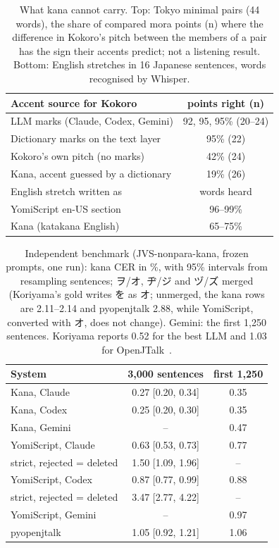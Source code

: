 \documentclass{Interspeech}
\newcommand{\ys}[1]{\mbox{\ipafont #1}}
\begin{document}
\begin{table}[t]
\centering\footnotesize
\caption{What kana cannot carry. Top: Tokyo minimal pairs (44 words), the share of compared mora points (n) where
the difference in Kokoro's pitch between the members of a pair has the sign their accents predict; not a listening
result. Bottom: English
stretches in 16 Japanese sentences, words recognised by Whisper.}
\label{tab:kana}
\setlength{\tabcolsep}{3pt}
\begin{tabular}{lc}
\toprule
Accent source for Kokoro & points right (n)\\
\midrule
LLM marks (Claude, Codex, Gemini) & 92, 95, 95\% (20--24)\\
Dictionary marks on the text layer & 95\% (22)\\
Kokoro's own pitch (no marks) & 42\% (24)\\
Kana, accent guessed by a dictionary & 19\% (26)\\
\midrule
English stretch written as & words heard\\
\midrule
YomiScript \ys{en-US} section & 96--99\%\\
Kana (katakana English) & 65--75\%\\
\bottomrule
\end{tabular}
\end{table}

\begin{table}[t]
\centering\footnotesize
\caption{Independent benchmark (JVS-nonpara-kana, frozen prompts, one run): kana CER in \%, with 95\% intervals
from resampling sentences; ヲ/オ, ヂ/ジ and ヅ/ズ merged (Koriyama's gold writes を as オ; unmerged, the kana rows are
2.11--2.14 and pyopenjtalk 2.88, while YomiScript, converted with オ, does not change). Gemini: the first 1{,}250
sentences. Koriyama reports 0.52 for the best LLM and 1.03 for
OpenJTalk~\cite{koriyama2026g2p}.}
\label{tab:koriyama}
\setlength{\tabcolsep}{3pt}
\begin{tabular}{lcc}
\toprule
System & 3{,}000 sentences & first 1{,}250\\
\midrule
Kana, Claude & 0.27 [0.20, 0.34] & 0.35\\
Kana, Codex & 0.25 [0.20, 0.30] & 0.35\\
Kana, Gemini & -- & 0.47\\
YomiScript, Claude & 0.63 [0.53, 0.73] & 0.77\\
\quad strict, rejected = deleted & 1.50 [1.09, 1.96] & --\\
YomiScript, Codex & 0.87 [0.77, 0.99] & 0.88\\
\quad strict, rejected = deleted & 3.47 [2.77, 4.22] & --\\
YomiScript, Gemini & -- & 0.97\\
pyopenjtalk & 1.05 [0.92, 1.21] & 1.06\\
\bottomrule
\end{tabular}
\end{table}
\end{document}
